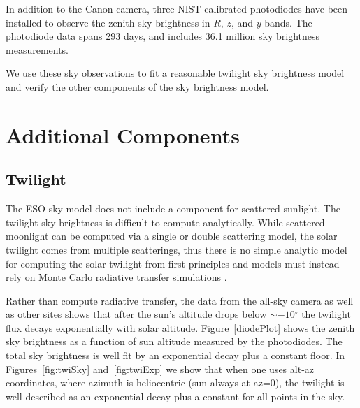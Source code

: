 \documentclass{emulateapj}  %
\newcommand\degree{{^\circ}}
\begin{document}
In addition to the Canon camera, three NIST-calibrated photodiodes have been installed to observe the zenith sky brightness in $R$, $z$, and $y$ bands. The photodiode data spans 293 days, and includes 36.1 million sky brightness measurements.

We use these sky observations to fit a reasonable twilight sky brightness model and verify the other components of the sky brightness model.

\section{Additional Components}
\subsection{Twilight}

The ESO sky model does not include a component for scattered sunlight.  The twilight sky brightness is difficult to compute analytically.  While scattered moonlight can be computed via a single or double scattering model, the solar twilight comes from multiple scatterings, thus there is no simple analytic model for computing the solar twilight from first principles and models must instead rely on Monte Carlo radiative transfer simulations \citep{Patat06}.

Rather than compute radiative transfer, the data from the all-sky camera as well as other sites shows that after the sun's altitude drops below $\sim-10\degree$ the twilight flux decays exponentially with solar altitude. Figure~\ref{diodePlot} shows the zenith sky brightness as a function of sun altitude measured by the photodiodes. The total sky brightness is well fit by an exponential decay plus a constant floor.  In Figures~\ref{fig:twiSky} and~\ref{fig:twiExp} we show that when one uses alt-az coordinates, where azimuth is heliocentric (sun always at az=0), the twilight is well described as an exponential decay plus a constant for all points in the sky.

\begin{figure*}
  \caption{The photodiode data.  All three photodiodes are pointed to zenith. The light gray points show individual measurements, while the yellow points are the median-binned data. The solid blue line shows the best fit exponential decay plus constant. The green vertical line marks 12 degree twilight, and the dashed vertical blue line shows where the data was not used because the detector was often saturated at that point. \label{diodePlot}}
\end{figure*}
\end{document}
